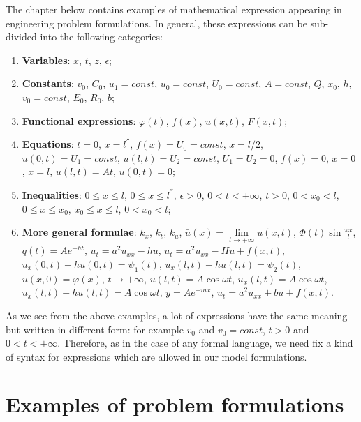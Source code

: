 The chapter below contains examples of mathematical expression appearing in engineering problem formulations. In general, these expressions can be sub-divided into the following categories:
\begin{enumerate}
\item {\bfseries Variables}: $x$, $t$, $z$, $\epsilon$;
\item {\bfseries Constants}: $v_{0}$, $C_{0}$, $u_{1}=const$, $u_{0}=const$, $U_{0}=const$, $A=const$, $Q$, $x_{0}$, $h$,  $v_{0}=const$, $E_{0}$, $R_{0}$, $b$;
\item {\bfseries Functional expressions}: $\varphi(t)$, $f(x)$, $u(x,t)$, $F(x,t)$;
\item {\bfseries Equations}: $t=0$, $x=l^{''}$, $f(x)=U_{0}=const$, $x=l/2$, $u(0,t)=U_{1}=const$, $u(l,t)=U_{2}=const$, $U_{1}=U_{2}=0$, $f(x)=0$, $x=0$, $x=l$, $u(l,t)=At$, $u(0,t)=0$;
\item {\bfseries Inequalities}: $0\leq x \leq l$, $0\leq x \leq l^{''}$, $\epsilon >0$, $0<t<+ \infty$, $t>0$, $0<x_{0}<l$, $0\leq x\leq x_{0}$, $x_{0}\leq x \leq l$, $0<x_{0}<l$;
\item {\bfseries More general formulae}: $k_{x}$, $k_{t}$, $k_{u}$, $\bar{u}(x)=\lim\limits_{t\to +\infty} u(x,t)$, $\Phi (t)\sin \frac{\pi x}{l}$, $q(t)=Ae^{-ht}$, $u_{t}=a^{2}u_{xx}-hu$, $u_{t}=a^{2}u_{xx}-Hu+f(x,t)$, $u_{x}(0,t)-hu(0,t)=\psi_{1}(t)$, $u_{x}(l,t)+hu(l,t)=\psi_{2}(t)$, $u(x,0)=\varphi (x)$, $t \to +\infty$, $u(l,t)=A \cos \omega t$, $u_{x}(l,t)=A \cos \omega t$, $u_{x}(l,t)+hu(l,t)=A \cos \omega t$, $y=Ae^{-mx}$, $u_{t}=a^{2}u_{xx}+bu+f(x,t)$.
\end{enumerate}
As we see from the above examples, a lot of expressions have the same meaning but written in different form: for example $v_{0}$ and $v_{0}=const$, $t>0$ and $0<t<+\infty$. Therefore, as in the case of any formal language, we need fix a kind of syntax for expressions which are allowed in our model formulations.\par

\section{Examples of problem formulations}

